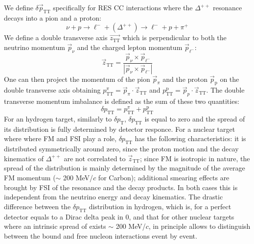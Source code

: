 We define $\delta \Vec{p}_\text{TT}$ specifically for RES CC interactions where the $\Delta^{++}$ resonance decays into a pion and a proton:
\begin{equation}
\label{eq:REStopology}
    \nu+p\rightarrow \ell^-+(\Delta^{++})\rightarrow \ell^-+p+\pi^+
\end{equation}
We define a double transverse axis $\Vec{z_\text{TT}}$ which is perpendicular to both the neutrino momentum $\Vec{p}_\nu$ and the charged lepton momentum $\Vec{p}_{\ell^-}$:
\begin{equation}
\label{eq:ztt}
\Vec{z}_\text{TT}=\frac{\Vec{p}_\nu\times\Vec{p}_{\ell^-}}{|\Vec{p}_\nu\times\Vec{p}_{\ell^-}|}
\end{equation}
One can then project the momentum of the pion $\Vec{p}_{\pi}$ and the proton $\Vec{p}_\text{p}$ on the double transverse axis obtaining $p^{\pi}_\text{TT}=\Vec{p}_{\pi}\cdot\Vec{z}_\text{TT}$ and $p^\text{p}_\text{TT}=\Vec{p}_{p}\cdot\Vec{z}_\text{TT}$. The double transverse momentum imbalance is defined as the sum of these two quantities: 
\begin{equation}
\label{eq:dpTT}
    \delta p_\text{TT}=p^{\pi}_\text{TT}+p^\text{p}_\text{TT}
\end{equation}
For an hydrogen target, similarly to $\delta p_\text{T}$, $\delta p_\text{TT}$ is equal to zero and the spread of its distribution is fully determined by detector responce. For a nuclear target where where FM and FSI play a role, $\delta p_\text{TT}$ has the following characteristics: it is distributed symmetrically around zero, since the proton motion and the decay kinematics of $\Delta^{++}$ are not correlated to $\Vec{z}_\text{TT}$; since FM is isotropic in nature, the spread of the distribution is  mainly determined by the magnitude of the average FM momentum ($\sim$ 200 MeV/$c$ for Carbon); additional smearing effects are brought by FSI of the resonance and the decay products. In both cases this is independent from the neutrino energy and decay kinematics. The drastic difference between the $\delta p_\text{TT}$ distribution in hydrogen, which is, for a perfect detector equals to a Dirac delta peak in 0, and that for other nuclear targets where an intrinsic spread of exists $\sim$ 200 MeV/$c$, in principle allows to distinguish between the bound and free nucleon interactions event by event.

